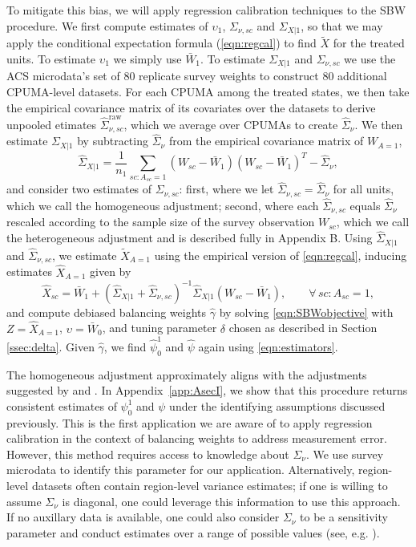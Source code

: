 \documentclass[aoas]{imsart}
\theoremstyle{plain}
\theoremstyle{remark}
\begin{document}
To mitigate this bias, we will apply regression calibration techniques to the SBW procedure. We first compute estimates of $\upsilon_1$, $\Sigma_{\nu, sc}$ and $\Sigma_{X|1}$, so that we may apply the conditional expectation formula (\ref{eqn:regcal}) to find $\tilde{X}$ for the treated units. To estimate $\upsilon_1$ we simply use $\bar{W}_1$. To estimate $\Sigma_{X|1}$ and $\Sigma_{\nu,sc}$ we use the ACS microdata's set of 80 replicate survey weights to construct 80 additional CPUMA-level datasets. For each CPUMA among the treated states, we then take the empirical covariance matrix of its covariates over the datasets to derive unpooled etimates $\hat{\Sigma}_{\nu,sc}^{\text{raw}}$, which we average over CPUMAs to create $\hat{\Sigma}_{\nu}$. We then estimate $\Sigma_{X|1}$ by subtracting $\hat{\Sigma}_{\nu}$ from the empirical covariance matrix of $W_{A=1}$,
\[ \hat{\Sigma}_{X|1} = \frac{1}{n_1} \sum_{sc:A_{sc}=1} (W_{sc} - \bar{W}_1)(W_{sc} - \bar{W}_1)^T - \hat{\Sigma}_{\nu},\]
and consider two estimates of $\Sigma_{\nu, sc}$: first, where we let $\hat{\Sigma}_{\nu,sc} = \hat{\Sigma}_{\nu}$ for all units, which we call the homogeneous adjustment; second, where each $\hat{\Sigma}_{\nu, sc}$ equals $\hat{\Sigma}_{\nu}$ rescaled according to the sample size of the survey observation $W_{sc}$, which we call the heterogeneous adjustment and is described fully in Appendix B. Using $\hat{\Sigma}_{X|1}$ and $\hat{\Sigma}_{\nu, sc}$, we estimate $\tilde{X}_{A=1}$ using the empirical version of \eqref{eqn:regcal}, inducing estimates $\hat{X}_{A=1}$ given by
\begin{equation}\label{eqn:hatX}
\hat{X}_{sc} = \bar{W}_1 + (\hat{\Sigma}_{X|1} + \hat{\Sigma}_{\nu,sc})^{-1} \hat{\Sigma}_{X|1} (W_{sc} - \bar{W}_1), \qquad \forall\, sc: A_{sc}=1,
\end{equation}
and compute debiased balancing weights $\hat{\gamma}$ by solving \eqref{eqn:SBWobjective} with $Z = \hat{X}_{A=1}$, $\upsilon = \bar{W}_0$, and tuning parameter $\delta$ chosen as described in Section \ref{ssec:delta}. Given $\hat{\gamma}$, we find $\hat{\psi}_0^1$ and $\hat{\psi}$ again using \eqref{eqn:estimators}. 

The homogeneous adjustment approximately aligns with the adjustments suggested by \cite{carroll2006measurement} and \cite{gleser1992importance}. In Appendix~\ref{app:AsecI}, we show that this procedure returns consistent estimates of $\psi_0^1$ and $\psi$ under the identifying assumptions discussed previously. This is the first application we are aware of to apply regression calibration in the context of balancing weights to address measurement error. However, this method requires access to knowledge about $\Sigma_{\nu}$. We use survey microdata to identify this parameter for our application. Alternatively, region-level datasets often contain region-level variance estimates; if one is willing to assume $\Sigma_{\nu}$ is diagonal, one could leverage this information to use this approach. If no auxillary data is available, one could also consider $\Sigma_{\nu}$ to be a sensitivity parameter and conduct estimates over a range of possible values (see, e.g. \cite{}). 
\end{document}
